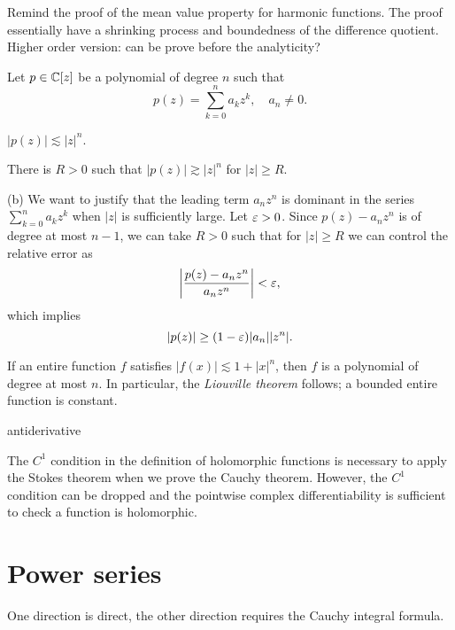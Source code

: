 \documentclass{../note}
\begin{document}
\begin{prb}
Remind the proof of the mean value property for harmonic functions.
The proof essentially have a shrinking process and boundedness of the difference quotient.
Higher order version: can be prove before the analyticity?
\end{prb}



\begin{prb}
Let $p\in\mathbb{C}[z]$ be a polynomial of degree $n$ such that
\[p(z)=\sum_{k=0}^na_kz^k,\quad a_n\ne0.\]
\begin{parts}
\item $|p(z)|\lesssim|z|^n$.
\item There is $R>0$ such that $|p(z)|\gtrsim|z|^n$ for $|z|\ge R$.
\end{parts}
\end{prb}
\begin{pf}
(b)
We want to justify that the leading term $a_nz^n$ is dominant in the series $\sum_{k=0}^na_kz^k$ when $|z|$ is sufficiently large.
Let $\varepsilon>0$.
Since $p(z)-a_nz^n$ is of degree at most $n-1$, we can take $R>0$ such that for $|z|\ge R$ we can control the relative error as
\[\left|\frac{p(z)-a_nz^n}{a_nz^n}\right|<\varepsilon,\]
which implies
\[|p(z)|\ge(1-\varepsilon)|a_n||z^n|.\]
\end{pf}


\begin{prb}
\begin{parts}
\item If an entire function $f$ satisfies $|f(x)|\lesssim1+|x|^n$, then $f$ is a polynomial of degree at most $n$. In particular, the \emph{Liouville theorem} follows; a bounded entire function is constant.
\end{parts}
\end{prb}

\begin{prb}
antiderivative
\end{prb}

\begin{prb}
The $C^1$ condition in the definition of holomorphic functions is necessary to apply the Stokes theorem when we prove the Cauchy theorem.
However, the $C^1$ condition can be dropped and the pointwise complex differentiability is sufficient to check a function is holomorphic.
\end{prb}


\section{Power series}
\begin{prb}
One direction is direct, the other direction requires the Cauchy integral formula.
\end{prb}
\end{document}
